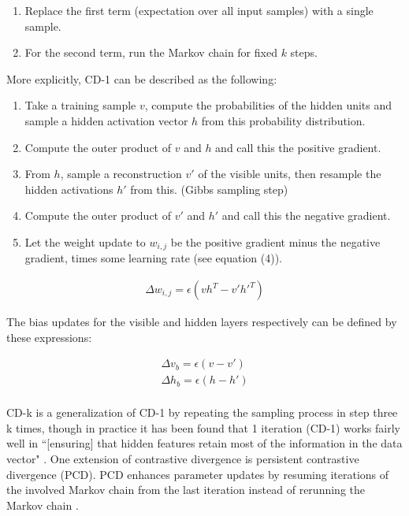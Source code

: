 \documentclass[journal]{IEEEtran}
\begin{document}
\begin{enumerate}
 \item Replace the first term (expectation over all input samples) with a single sample.
 \item For the second term, run the Markov chain for fixed $k$ steps.
\end{enumerate}

More explicitly, CD-1 can be described as the following:

\begin{enumerate}
\item Take a training sample $v$, compute the probabilities of the hidden units and sample a hidden activation vector $h$ from this probability distribution.
\item Compute the outer product of $v$ and $h$ and call this the positive gradient.
\item From $h$, sample a reconstruction $v'$ of the visible units, then resample the hidden activations $h'$ from this. (Gibbs sampling step)
\item Compute the outer product of $v'$ and $h'$ and call this the negative gradient.
\item Let the weight update to $w_{i,j}$ be the positive gradient minus the negative gradient, times some learning rate (see equation (4)). 
\end{enumerate}

\begin{equation}
\begin{aligned}
\Delta w_{i,j} = \epsilon(vh^{T} - v'h'^{T})
\end{aligned}
\end{equation}

The bias updates for the visible and hidden layers respectively can be defined by these expressions:

\begin{equation}
\begin{aligned}
\Delta v_{b} = \epsilon(v - v')\\
\Delta h_{b} = \epsilon(h - h')\\
\end{aligned}
\end{equation}

CD-k is a generalization of CD-1 by repeating the sampling process in step three k times, though in practice it has been found that 1 iteration (CD-1) works fairly well in ``[ensuring] that hidden features retain most of the information in the data vector" \cite{hinton2010practical}.  One extension of contrastive divergence is persistent contrastive divergence (PCD). PCD enhances parameter updates by resuming iterations of the involved Markov chain from the last iteration instead of rerunning the Markov chain \cite{tieleman2008training}.
\end{document}
